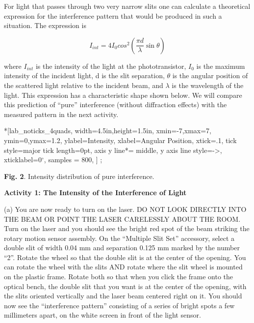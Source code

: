 For light that passes through two very narrow slits one can calculate
a theoretical expression for the interference pattern that would be
produced in such a situation. The expression is 

\begin{equation} I_{int} = 4I_0 cos^2 \left (\frac {\pi d} {\lambda} \sin \theta \right ) \end{equation}

where $I_{int}$ is the intensity of the light at the phototransistor,
$I_{0}$ is the maximum intensity of the incident light, d is
the slit separation, \( \theta  \) is the angular position of the
scattered light relative to the incident beam, and \( \lambda  \)
is the wavelength of the light. This expression has a characteristic
shape shown below. We will compare this prediction of {}``pure''
interference (without diffraction effects) with the measured pattern
in the next activity.

\begin{lab_axis}*[lab_noticks_4quads,
	width=4.5in,height=1.5in,
	xmin=-7,xmax=7,
	ymin=0,ymax=1.2,
	ylabel=Intensity,
	xlabel=Angular Position,
	xtick={.1}, %
	tick style={major tick length=0pt},
	axis y line*= {middle, y axis line style={->}}, %
	xticklabel={0$^\circ$},
	samples = 800,
]
;
\end{lab_axis}

{\centering \textbf{Fig. 2}. Intensity distribution of pure interference.\par}

\textbf{Activity 1: The Intensity of the Interference of Light }

(a) You are now ready to turn on the laser. DO NOT LOOK DIRECTLY INTO
THE BEAM OR POINT THE LASER CARELESSLY ABOUT THE ROOM. Turn on the
laser and you should see the bright red spot of the beam striking
the rotary motion sensor assembly. On the ``Multiple Slit Set'' accessory, 
select a double slit of width 0.04 mm and separation 0.125 mm marked by the number “2”. 
Rotate the 
wheel so that the double slit is at the center of the opening.
You can rotate the wheel with the slits AND rotate where the slit wheel is mounted
on the plastic frame. Rotate both so that when you click the frame onto the optical bench, the double slit that
you want is at the center of the opening, with the slits oriented vertically and the laser beam centered right on
it. You should now see the “interference pattern” consisting of a series of bright spots a few millimeters apart,
on the white screen in front of the light sensor.

